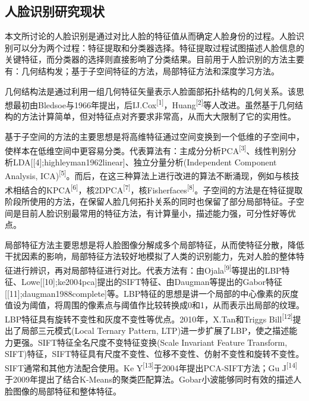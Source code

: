 \documentclass[bachelor,zhspacing]{cqu}  %
\begin{document}
\subsection{人脸识别研究现状}\label{ux4ebaux8138ux8bc6ux522bux7814ux7a76ux73b0ux72b6}

本文所讨论的人脸识别是通过对比人脸的特征值从而确定人脸身份的过程。人脸识别可以分为两个过程：特征提取和分类器选择。特征提取过程试图描述人脸信息的关键特征，而分类器的选择则直接影响了分类结果。目前用于人脸识别的方法主要有：几何结构发；基于子空间特征的方法，局部特征方法和深度学习方法。

几何结构法是通过利用一组几何特征矢量表示人脸面部拓扑结构的几何关系。该思想最初由Bledsoe与1966年提出，后IJ.Cox\textsuperscript{{[}1{]}}，Huang\textsuperscript{{[}2{]}}等人改进。虽然基于几何结构的方法计算简单，但对特征点对齐要求非常高，从而大大限制了它的实用性。

基于子空间的方法的主要思想是将高维特征通过空间变换到一个低维的子空间中，使样本在低维空间中更容易分类。代表算法有：主成分分析PCA\textsuperscript{{[}3{]}}、线性判别分析LDA{[}{[}4{]};highleyman1962linear{]}、独立分量分析(Independent
Component Analysis,
ICA)\textsuperscript{{[}5{]}}。而后，在这三种算法上进行改进的算法不断涌现，例如与核技术相结合的KPCA\textsuperscript{{[}6{]}}，核2DPCA\textsuperscript{{[}7{]}}，核Fisherfaces\textsuperscript{{[}8{]}}。子空间的方法是在特征提取阶段所使用的方法，在保留人脸几何拓扑关系的同时也保留了部分局部特征。子空间是目前人脸识别最常用的特征方法，有计算量小，描述能力强，可分性好等优点。

局部特征方法主要思想是将人脸图像分解成多个局部特征，从而使特征分散，降低干扰因素的影响，局部特征方法较好地模拟了人类的识别能力，先对人脸的整体特征进行辨识，再对局部特征进行对比。代表方法有：由Ojala\textsuperscript{{[}9{]}}等提出的LBP特征、Lowe{[}{[}10{]};ke2004pca{]}提出的SIFT特征、由Daugman等提出的Gabor特征{[}{[}11{]};daugman1988complete{]}等。LBP特征的思想是讲一个局部的中心像素的灰度值设为阈值，将周围的像素点与阈值作比较转换成0和1，从而表示出局部的纹理。LBP特征具有旋转不变性和灰度不变性等优点。2010年，X.Tan和Triggs
Bill\textsuperscript{{[}12{]}}提出了局部三元模式(Local Ternary Pattern,
LTP)进一步扩展了LBP，使之描述能力更强。SIFT特征全名尺度不变特征变换(Scale
Invariant Feature Transform,
SIFT)特征，SIFT特征具有尺度不变性、位移不变性、仿射不变性和旋转不变性。SIFT通常和其他方法配合使用。Ke
Y\textsuperscript{{[}13{]}}于2004年提出PCA-SIFT方法；Gu
J\textsuperscript{{[}14{]}}于2009年提出了结合K-Means的聚类匹配算法。Gobar小波能够同时有效的描述人脸图像的局部特征和整体特征。
\end{document}
